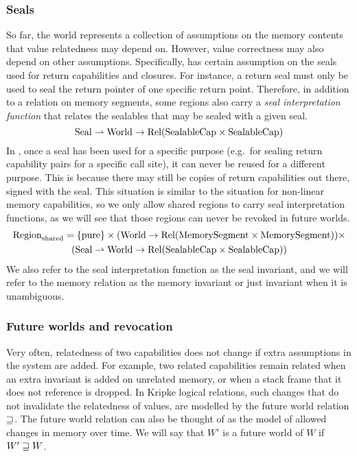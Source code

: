 \begin{jversion}
\subsubsection{Seals}
\label{subsubsec:seals}
So far, the world represents a collection of assumptions on the memory contents that value relatedness may depend on.
However, value correctness may also depend on other assumptions.
Specifically, \stktokens{} has certain assumption on the seals used for return capabilities and closures.
For instance, a return seal must only be used to seal the return pointer of one specific return point.
Therefore, in addition to a relation on memory segments, some regions also carry a \emph{seal interpretation function} that relates the sealables that may be sealed with a given seal.
  \[
    \mathrm{Seal} \rightharpoonup \mathrm{World} \rightarrow \mathrm{Rel}(\mathrm{SealableCap} \times \mathrm{SealableCap})
  \]
  In \stktokens{}, once a seal has been used for a specific purpose (e.g.\ for sealing return capability pairs for a specific call site), it can never be reused for a different purpose.
  This is because there may still be copies of return capabilities out there, signed with the seal.
  This situation is similar to the situation for non-linear memory capabilities, so we only allow shared regions to carry seal interpretation functions, as we will see that those regions can never be revoked in future worlds.
\begin{multline*}
  \mathrm{Region}_\mathrm{shared} = 
  \{\mathrm{pure} \} \times (\mathrm{World} \rightarrow \mathrm{Rel}(\mathrm{MemorySegment}\times\mathrm{MemorySegment})) \times \\
  (\mathrm{Seal} \rightharpoonup \mathrm{World} \rightarrow \mathrm{Rel}(\mathrm{SealableCap} \times \mathrm{SealableCap}))
\end{multline*}
We also refer to the seal interpretation function as the seal invariant, and we will refer to the memory relation as the memory invariant or just invariant when it is unambiguous.


\subsubsection{Future worlds and revocation}
\label{subsubsec:ft-and-revocation}
Very often, relatedness of two capabilities does not change if extra assumptions in the system are added.
For example, two related capabilities remain related when an extra invariant is added on unrelated memory, or when a stack frame that it does not reference is dropped.
In Kripke logical relations, such changes that do not invalidate the relatedness of values, are modelled by the future world relation $\sqsupseteq$.
The future world relation can also be thought of as the model of allowed changes in memory over time.
We will say that $W'$ is a future world of $W$ if $W' \sqsupseteq W$.


\end{jversion}
